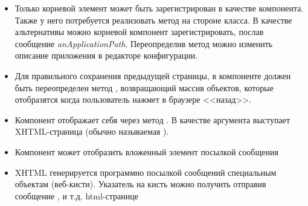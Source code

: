 \documentclass[a4paper,10pt,twoside]{book}
\begin{document}
\begin{itemize}
\item Только корневой элемент может быть зарегистрирован в качестве
компонента. Также у него потребуется реализовать метод 
на стороне класса. В качестве альтернативы можно корневой компонент
зарегистрировать, послав сообщение
 \emph{anApplicationPath}.
Переопределив метод  можно изменить описание приложения
в редакторе конфигурации.
\item Для правильного сохранения предыдущей страницы, в компоненте
должен быть переопределен метод , возвращающий массив
объектов, которые отобразятся когда пользователь нажмет в браузере
<<назад>>.
\item Компонент отображает себя через метод .
В качестве аргумента выступает XHTML-страница
(обычно называемая ).
\item Компонент может отобразить вложенный элемент посылкой сообщения
\item XHTML генерируется программно посылкой сообщений специальным
объектам (веб-кисти). Указатель на кисть можно получить отправив
сообщение ,  и т.д. html-странице

\end{itemize}
\end{document}

